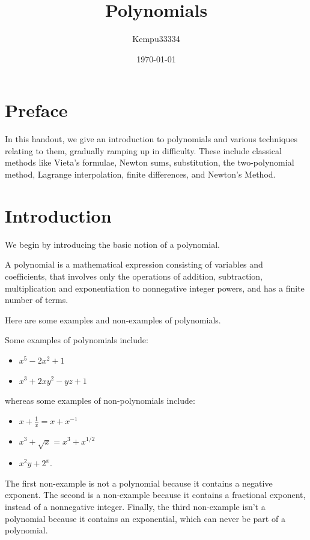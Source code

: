 \documentclass[11pt]{scrartcl}
\title{Polynomials}
\author{\LARGE Kempu33334}
\date{\large \today}
\begin{document}
\maketitle

\tableofcontents

\newpage

\section{Preface}
\large

In this handout, we give an introduction to polynomials and various techniques relating to them, gradually ramping up in difficulty. These include classical methods like Vieta's formulae, Newton sums, substitution, the two-polynomial method, Lagrange interpolation, finite differences, and Newton's Method.

\section{Introduction}

We begin by introducing the basic notion of a polynomial.

\begin{definition*}[Polynomial]
A polynomial is a mathematical expression consisting of variables and coefficients, that involves only the operations of addition, subtraction, multiplication and exponentiation to nonnegative integer powers, and has a finite number of terms.
\end{definition*}

Here are some examples and non-examples of polynomials.

\begin{example*}
Some examples of polynomials include:
\begin{itemize}
\item $x^5-2x^2+1$
\item $x^3+2xy^2-yz+1$
\end{itemize}
whereas some examples of non-polynomials include:
\begin{itemize}
\item $x+\tfrac{1}{x} = x+x^{-1}$
\item $x^3+\sqrt{x} = x^3+x^{1/2}$
\item $x^2y+2^x$.
\end{itemize}
\end{example*}

The first non-example is not a polynomial because it contains a negative exponent. The second is a non-example because it contains a fractional exponent, instead of a nonnegative integer. Finally, the third non-example isn't a polynomial because it contains an exponential, which can never be part of a polynomial.
\end{document}
